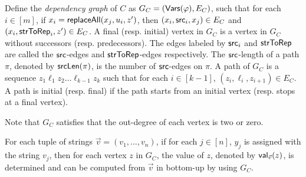 \documentclass{llncs}
\newcommand{\zhilin}[1]{\color{cyan} {ZL: #1 :LZ} \color{black}}
\begin{document}
\begin{definition}
Define the \emph{dependency graph} of $C$ as $G_C= (\mathsf{Vars}(\varphi), E_C)$, such that for each $i \in [m]$, if $x_i = \mathsf{replaceAll}(x_j, u_i, z')$, then $(x_i, \mathsf{src}_i, x_j) \in E_C$ and $(x_i, \mathsf{strToRep}_i, z') \in E_C$. A final (resp. initial) vertex in $G_C$ is a vertex in $G_C$ without successors (resp. predecessors). The edges labeled by $\mathsf{src}_i$ and $\mathsf{strToRep}$ are called the $\mathsf{src}$-edges and $\mathsf{strToRep}$-edges respectively. The $\mathsf{src}$-length of a path $\pi$, denoted by $\mathsf{srcLen}(\pi)$, is the number of $\mathsf{src}$-edges on $\pi$. A path of $G_C$ is a sequence $z_1 \ell_1 z_2 \dots \ell_{k-1} z_k$ such that for each $i \in [k-1]$, $(z_i, \ell_i, z_{i+1}) \in E_C$. A path is initial (resp. final) if the path starts from an initial vertex (resp. stops at a final vertex).
\end{definition}
Note that $G_C$ satisfies that the out-degree of each vertex is two or zero. 

For each tuple of strings $\vec{v}=(v_1,\dots, v_n)$, if for each $j \in [n]$, $y_j$ is assigned with the string $v_j$, then for each vertex $z$ in $G_C$, the value of $z$, denoted by $\mathsf{val}_{\vec{v}}(z)$, is determined and can be computed from $\vec{v}$ in bottom-up by using $G_C$. 




\end{document}
